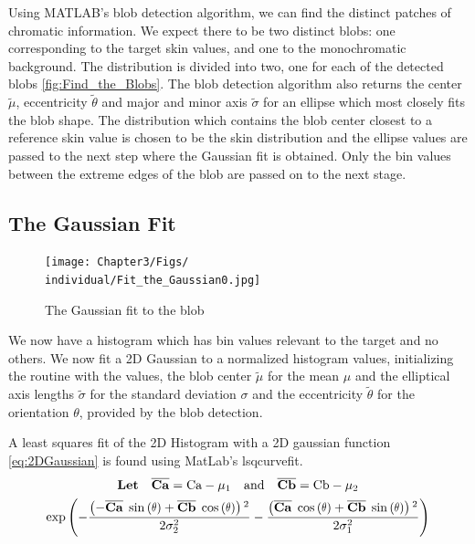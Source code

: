 Using MATLAB's blob detection algorithm, we can find the distinct patches of chromatic information. We expect there to be two distinct blobs: one corresponding to the target skin values, and one to the monochromatic background. The distribution is divided into two, one for each of the detected blobs \ref{fig:Find_the_Blobs}. The blob detection algorithm also returns the center $\widetilde{\mu}$, eccentricity $\widetilde{\theta}$ and major and minor axis $\widetilde{\sigma}$ for an ellipse which most closely fits the blob shape. The distribution which contains the blob center closest to a reference skin value is chosen to be the skin distribution and the ellipse values are passed to the next step where the Gaussian fit is obtained. Only the bin values between the extreme edges of the blob are passed on to the next stage.

\subsection{The Gaussian Fit}\label{sec:TheGaussianFit}

\begin{figure}[h!]
  \centering
    \texttt{[image: Chapter3/Figs/\\individual/Fit\_the\_Gaussian0.jpg]}
        \caption{The Gaussian fit to the blob}  \label{fig:Fit_the_Gaussian0}
    \end{figure}


We now have a histogram which has bin values relevant to the target and no others. We now fit a 2D Gaussian to a normalized histogram values, initializing the routine with the values, the blob center $\widetilde{\mu}$ for the mean $\mu$ and the  elliptical axis lengths $\widetilde{\sigma}$ for the standard deviation $\sigma$  and the eccentricity $\widetilde{\theta}$  for the orientation $\theta$, provided by the blob detection.

A least squares fit of the 2D Histogram with a 2D gaussian function \ref{eq:2DGaussian}  is found using MatLab's lsqcurvefit.
\newcommand{\CaMu}{ \overline{\mathbf{Ca}} }
\newcommand{\CbMu}{\overline{\mathbf{Cb}}  }
\begin{gather}\label{eq:2DGaussian}
\textbf{Let} \quad \CaMu = \text{Ca}-\mu_1 \quad \text{and} \quad \CbMu = \text{Cb}-\mu_2 \\
\exp \left(
-\frac{\left( - \CaMu \; \sine{     \theta } + \CbMu \; \cosine{ \theta } \right){}^2}{2 \sigma_2^2} - 
\frac{\left(      \CaMu \; \cosine{ \theta } + \CbMu \; \sine{      \theta} \right){}^2}{2 \sigma_1^2} \right)
\end{gather}



